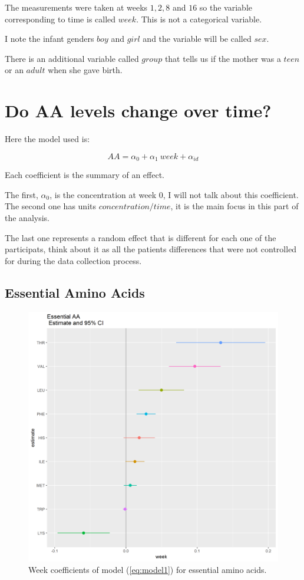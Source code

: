 \documentclass[12pt]{article}
\begin{document}
The measurements were taken at weeks $1, 2, 8$ and $16$ so the variable corresponding to time is called $week$. This is not a categorical variable.

I note the infant genders $boy$ and $girl$ and the variable will be called $sex$.

There is an additional variable called $group$ that tells us if the mother was a $teen$ or an $adult$ when she gave birth.

\section{Do AA levels change over time?}

Here the model used is:

\begin{equation} \label{eq:model1}
  AA = \alpha_0 + \alpha_1 \ week + \alpha_{id}
\end{equation}

Each coefficient is the summary of an effect.

The first, $\alpha_0$, is the concentration at week $0$, I will not talk about this coefficient. The second one has units $concentration/time$, it is the main focus in this part of the analysis.

The last one represents a random effect that is different for each one of the participats, think about it as all the patients differences that were not controlled for during the data collection process.

\subsection{Essential Amino Acids}

\begin{figure}[!htb]
  \includegraphics[width= \textwidth]{../week/EAA_W_coeff.png}
  \caption{Week coefficients of model (\ref{eq:model1}) for essential amino acids.}
  \label{fig:EAA_W_coeff}
\end{figure}
\end{document}
